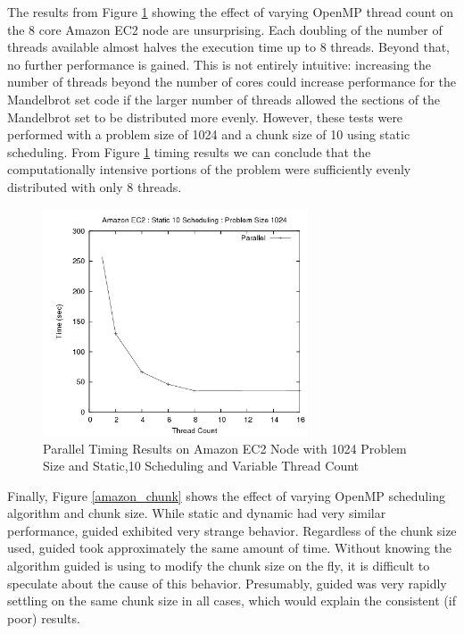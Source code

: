 \documentclass{article}
\begin{document}
The results from Figure \ref{amazon_threads} showing the effect of varying OpenMP thread count on the 8 core Amazon EC2 node are unsurprising. Each doubling of the number of threads available almost halves the execution time up to 8 threads. Beyond that, no further performance is gained. This is not entirely intuitive: increasing the number of threads beyond the number of cores could increase performance for the Mandelbrot set code if the larger number of threads allowed the sections of the Mandelbrot set to be distributed more evenly. However, these tests were performed with a problem size of 1024 and a chunk size of 10 using static scheduling. From Figure \ref{amazon_threads} timing results we can conclude that the computationally intensive portions of the problem were sufficiently evenly distributed with only 8 threads.

\begin{figure}
\centering
\includegraphics[width=0.7\textwidth]{../data/amazon_threads.png}
\caption{Parallel Timing Results on Amazon EC2 Node with 1024 Problem Size and Static,10 Scheduling and Variable Thread Count}
\label{amazon_threads}
\end{figure}

Finally, Figure \ref{amazon_chunk} shows the effect of varying OpenMP scheduling algorithm and chunk size. While static and dynamic had very similar performance, guided exhibited very strange behavior. Regardless of the chunk size used, guided took approximately the same amount of time. Without knowing the algorithm guided is using to modify the chunk size on the fly, it is difficult to speculate about the cause of this behavior. Presumably, guided was very rapidly settling on the same chunk size in all cases, which would explain the consistent (if poor) results.
\end{document}
